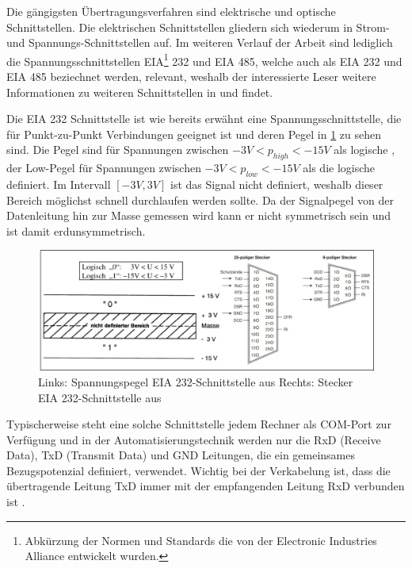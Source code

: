 Die gängigsten Übertragungsverfahren sind elektrische und optische Schnittstellen. Die elektrischen Schnittstellen gliedern sich wiederum in Strom- und Spannungs-Schnittstellen auf. Im weiteren Verlauf der Arbeit sind lediglich die Spannungsschnittstellen EIA\footnote{Abkürzung der Normen und Standards die von der Electronic Industries Alliance entwickelt wurden.} 232 und EIA 485, welche auch als EIA 232 und EIA 485 beziechnet werden, relevant, weshalb der interessierte Leser weitere Informationen zu weiteren Schnittstellen in \cite[S.~13ff.]{sch08} und \cite[S.~57ff.]{schn06} findet.

Die EIA 232 Schnittstelle ist wie bereits erwähnt eine Spannungsschnittstelle, die für Punkt-zu-Punkt Verbindungen geeignet ist und deren Pegel in \ref{fig:rs232} zu sehen sind. Die Pegel sind für Spannungen zwischen $-3V<p_{high}<-15V$ als logische \Gob, der Low-Pegel für Spannungen zwischen $-3V<p_{low}<-15V$ als die logische \Gob definiert. Im Intervall $[-3V,3V]$ ist das Signal nicht definiert, weshalb dieser Bereich möglichst schnell durchlaufen werden sollte. Da der Signalpegel von der Datenleitung hin zur Masse gemessen wird kann er nicht symmetrisch sein und ist damit erdunsymmetrisch. \cite[S.~57f.]{schn06}

\begin{figure}
\centering
\includegraphics[width=\textwidth]{abbildungen/20160314_rs232}
\caption[Spannungspegel und Stecker der EIA 232-Schnittstelle]{Links: Spannungspegel EIA 232-Schnittstelle aus \cite[S.~57]{schn06} \newline Rechts: Stecker EIA 232-Schnittstelle aus \cite[S.~14]{sch08}}
\label{fig:rs232}
\end{figure}

Typischerweise steht eine solche Schnittstelle jedem Rechner als COM-Port zur Verfügung und in der Automatisierungstechnik werden nur die RxD (Receive Data), TxD (Transmit Data) und GND Leitungen, die ein gemeinsames Bezugspotenzial definiert, verwendet. Wichtig bei der Verkabelung ist, dass die übertragende Leitung TxD immer mit der empfangenden Leitung RxD verbunden ist \cite[S.~14f.]{sch08}.


